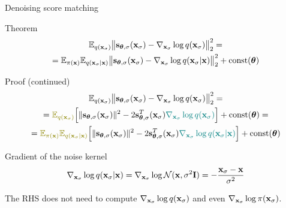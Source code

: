 \begin{frame}{Denoising score matching}
	\begin{block}{Theorem}
	\vspace{-0.7cm}
	\begin{multline*}
		\mathbb{E}_{q(\mathbf{x}_{\sigma})}\bigl\| \mathbf{s}_{\boldsymbol{\theta}, \sigma}(\mathbf{x}_{\sigma}) - \nabla_{\mathbf{x}_{\sigma}} \log q(\mathbf{x}_{\sigma}) \bigr\|^2_2 = \\
		= \mathbb{E}_{\pi(\mathbf{x})} \mathbb{E}_{q(\mathbf{x}_{\sigma} | \mathbf{x})}\bigl\| \mathbf{s}_{\boldsymbol{\theta}, \sigma}(\mathbf{x}_{\sigma}) - \nabla_{\mathbf{x}_{\sigma}} \log q(\mathbf{x}_{\sigma} | \mathbf{x}) \bigr\|^2_2 + \text{const}(\boldsymbol{\theta})
	\end{multline*}
	\vspace{-0.9cm}
	\end{block}
	\begin{block}{Proof (continued)}
		\vspace{-0.7cm}
		{\small
		\begin{multline*}
			\bbE_{q(\bx_{\sigma})}\bigl\| \bs_{\btheta, \sigma}(\bx_{\sigma}) - \nabla_{\bx_{\sigma}} \log q(\bx_{\sigma}) \bigr\|^2_2 = \\ 
			= {\color{olive}\bbE_{q(\bx_{\sigma})}} \Bigl[\| \bs_{\btheta, \sigma}(\bx_{\sigma}) \|^2 - 2 \bs_{\btheta, \sigma}^T(\bx_{\sigma}) {\color{teal}\nabla_{\bx_{\sigma}} \log q(\bx_{\sigma})} \Bigr] + \text{const}(\btheta) = \\
			= {\color{olive}\bbE_{\pi(\bx)} \bbE_{q(\bx_{\sigma} | \bx)}}\Bigl[\| \bs_{\btheta, \sigma}(\bx_{\sigma}) \|^2 - 2 \bs_{\btheta, \sigma}^T(\bx_{\sigma}) {\color{teal}\nabla_{\bx_{\sigma}} \log q(\bx_{\sigma} | \bx)} \Bigr] + \text{const}(\btheta)
		\end{multline*}
		}
		\vspace{-0.8cm}
	\end{block}
	\begin{block}{Gradient of the noise kernel}
	\vspace{-0.4cm}
	\[
		\nabla_{\mathbf{x}_{\sigma}} \log q(\mathbf{x}_{\sigma} | \mathbf{x}) = \nabla_{\mathbf{x}_{\sigma}} \log \mathcal{N}(\mathbf{x}, \sigma^2 \mathbf{I}) = - \frac{\mathbf{x}_{\sigma} - \mathbf{x}}{\sigma^2}
	\]
	\vspace{-0.5cm}
	\end{block}
	The RHS does not need to compute $\nabla_{\mathbf{x}_{\sigma}} \log q(\mathbf{x}_{\sigma})$ and even $\nabla_{\mathbf{x}_{\sigma}} \log \pi(\mathbf{x}_{\sigma})$.
\end{frame}
